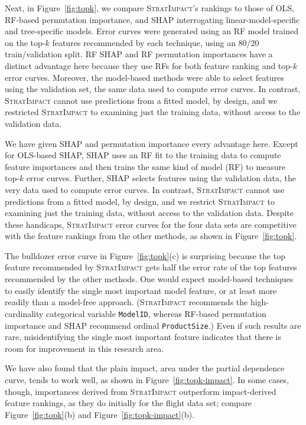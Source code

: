 \documentclass[11pt]{article}
\newcommand{\figref}[1]{Figure~\ref{#1}}
\newcommand{\simp}{\fontfamily{cmr}\textsc{\small StratImpact}}
\begin{document}
Next, in \figref{fig:topk}, we compare \simp{}'s rankings to those of OLS, RF-based permutation importance, and SHAP interrogating linear-model-specific and tree-specific models. Error curves were generated using an RF model trained on the top-$k$ features recommended by each technique, using an 80/20 train/validation split. RF SHAP and RF permutation importances have a distinct advantage here because they use RFs for both feature ranking and top-$k$ error curves. Moreover, the model-based methods were able to select features using the validation set, the same data used to compute error curves. In contrast, \simp{} cannot use predictions from a fitted model, by design, and we restricted \simp{} to examining just the training data, without access to the validation data. 

We have given SHAP and permutation importance every advantage here.  Except for OLS-based SHAP, SHAP uses an RF fit to the training data to compute feature importances and then trains the same kind of model (RF) to measure top-$k$ error curves.  Further, SHAP selects features using the validation data, the very data used to compute error curves. In contrast, \simp{} cannot use predictions from a fitted model, by design, and we restrict \simp{} to examining just the training data, without access to the validation data. Despite these handicaps, \simp{} error curves for the four data sets are competitive with the feature rankings from the other methods, as shown in \figref{fig:topk}. 

The bulldozer error curve in \figref{fig:topk}(c) is surprising because the top feature recommended by \simp{} gets half the error rate of the top features recommended by the other methods. One would expect model-based techniques to easily identify the single most important model feature, or at least more readily than a model-free approach.  (\simp{} recommends the high-cardinality categorical variable {\tt ModelID}, whereas RF-based permutation importance and SHAP recommend ordinal {\tt ProductSize}.)  Even if such results are rare, misidentifying the single most important feature indicates that there is room for improvement in this research area.

We have also found that the plain impact, area under the partial dependence curve, tends to work well, as shown in \figref{fig:topk-impact}. In some cases, though, importances derived from \simp{} outperform impact-derived feature rankings, as they do initially for the flight data set; compare \figref{fig:topk}(b) and \figref{fig:topk-impact}(b).
\end{document}
